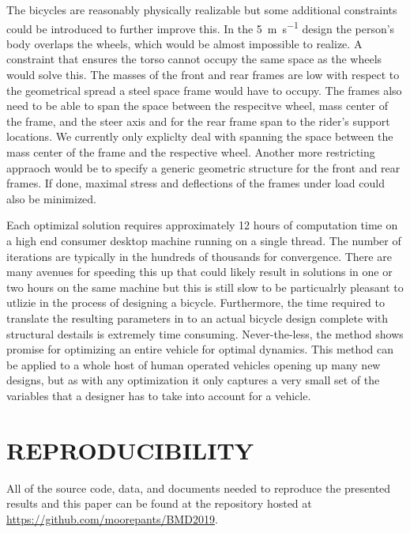 \documentclass{bmd2019p}
\begin{document}
The bicycles are reasonably physically realizable but some additional
constraints could be introduced to further improve this. In the
5~\si{\meter\per\second} design the person's body overlaps the wheels, which
would be almost impossible to realize. A constraint that ensures the torso
cannot occupy the same space as the wheels would solve this. The masses of the
front and rear frames are low with respect to the geometrical spread a steel
space frame would have to occupy. The frames also need to be able to span the
space between the respecitve wheel, mass center of the frame, and the steer
axis and for the rear frame span to the rider's support locations. We currently
only expliclty deal with spanning the space between the mass center of the
frame and the respective wheel. Another more restricting appraoch would be to
specify a generic geometric structure for the front and rear frames. If done,
maximal stress and deflections of the frames under load could also be
minimized.

Each optimizal solution requires approximately 12 hours of computation time on
a high end consumer desktop machine running on a single thread. The number of
iterations are typically in the hundreds of thousands for convergence. There
are many avenues for speeding this up that could likely result in solutions in
one or two hours on the same machine but this is still slow to be particualrly
pleasant to utlizie in the process of designing a bicycle. Furthermore, the
time required to translate the resulting parameters in to an actual bicycle
design complete with structural destails is extremely time consuming.
Never-the-less, the method shows promise for optimizing an entire vehicle for
optimal dynamics. This method can be applied to a whole host of human operated
vehicles opening up many new designs, but as with any optimization it only
captures a very small set of the variables that a designer has to take into
account for a vehicle.

\section{REPRODUCIBILITY}
%
All of the source code, data, and documents needed to reproduce the presented
results and this paper can be found at the repository hosted at
\url{https://github.com/moorepants/BMD2019}.



\end{document}
